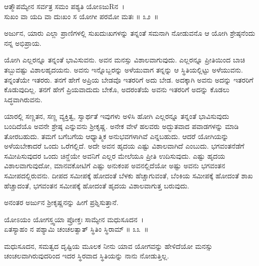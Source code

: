 \begin{shloka}
ಆತ್ಮೌಪಮ್ಯೇನ ಸರ್ವತ್ರ ಸಮಂ ಪಶ್ಯತಿ ಯೋಽಜುRನ~।\\ಸುಖಂ ವಾ ಯದಿ ವಾ ದುಃಖಂ ಸ ಯೋಗೀ ಪರಮೋ ಮತಃ \hfill॥ ೩೨~॥
\end{shloka}

\begin{artha}
ಅರ್ಜುನ, ಯಾರು ಎಲ್ಲಾ ಪ್ರಾಣಿಗಳಲ್ಲಿ ಸುಖದುಃಖಗಳನ್ನು ತನ್ನಂತೆ ಸಮನಾಗಿ ನೋಡುವನೊ ಆ ಯೋಗಿ ಶ್ರೇಷ್ಠನೆಂದು ನನ್ನ ಅಭಿಪ್ರಾಯ.
\end{artha}

ಯೋಗಿ ಎಲ್ಲರನ್ನೂ ತನ್ನಂತೆ ಭಾವಿಸುವನು. ಅವನ ಮನಸ್ಸು ವಿಶಾಲವಾಗುವುದು. ಎಲ್ಲರನ್ನೂ ಪ್ರೀತಿಯಿಂದ ಬಾಚಿ ತಬ್ಬುವಷ್ಟು ವಿಶಾಲಹೃದಯನು. ಅವನು ಇನ್ನೊಬ್ಬರನ್ನು ಅಳೆಯುವಾಗ ತನ್ನನ್ನು ಆ ಸ್ಥಿತಿಯಲ್ಲಿಟ್ಟು ಅಳೆಯುವನು. ತನ್ನಂತೆಯೇ ಇತರರು. ತನಗೆ ಹೇಗೆ ಅಪ್ರಿಯ ಬೇಡವೊ ಇತರರಿಗೆ ಅದು ಬೇಡ. ಅದಕ್ಕಾಗಿ ಅವನು ಅದನ್ನು ಇತರರಿಗೆ ಕೊಡುವುದಿಲ್ಲ. ತನಗೆ ಹೇಗೆ ಪ್ರಿಯವಾದುದು ಬೇಕೊ, ಅದರಂತೆಯೆ ಅವನು ಇತರರಿಗೆ ಅದನ್ನು ಕೊಡಲು ಸಿದ್ಧವಾಗಿರುವನು.

ಯಾರಲ್ಲಿ ಸಣ್ಣತನ, ಸಣ್ಣ ವ್ಯಕ್ತಿತ್ವ, ಸ್ವಾರ್ಥತೆ ಇವುಗಳು ಅಳಿಸಿ ಹೋಗಿ ಎಲ್ಲರನ್ನೂ ತನ್ನಂತೆ ಭಾವಿಸುವುದು ಬಂದಿದೆಯೊ ಅವನೇ ಶ್ರೇಷ್ಠ ಎನ್ನುವನು ಶ‍್ರೀಕೃಷ್ಣ. ಅನೇಕ ವೇಳೆ ಹಲವರು ಅದ್ಭುತವಾದ ಪವಾಡಗಳನ್ನು ಮಾಡಿ ತೋರಬಹುದು. ತಮಗೆ ಬಗೆಬಗೆಯ ಆಧ್ಯಾತ್ಮಿಕ ಅನುಭವಗಳಾಗಿವೆ ಎನ್ನಬಹುದು. ಆದರೆ ಯೋಗಿಯನ್ನು ಅಳೆಯಬೇಕಾದರೆ ಒಂದು ಒರೆಗಲ್ಲಿದೆ. ಅದೇ ಅವನ ಹೃದಯ ಎಷ್ಟು ವಿಶಾಲವಾಗಿದೆ ಎಂಬುದು. ಭಗವಂತನೆಡೆಗೆ ಸಮೀಪಿಸುವುದರ ಒಂದು ಚಿನ್ಹೆಯೇ ಅವನಿಗೆ ಎಲ್ಲರ ಮೇಲೆಯೂ ಪ್ರೀತಿ ಉದಿಸುವುದು. ಎಷ್ಟು ಹೃದಯ ವಿಶಾಲವಾಗುವುದೋ, ಮಾನವಕೋಟಿಗೆ ಎಷ್ಟು ಅನುಕಂಪ ಅವನಲ್ಲಿದೆಯೋ ಅಷ್ಟು ಅವನು ಭಗವಂತನ ಸಮೀಪದಲ್ಲಿರುವನು. ದೀಪದ ಸಮೀಪಕ್ಕೆ ಹೋದಂತೆ ಬೆಳಕು ಹೆಚ್ಚಾಗುವಂತೆ, ಬೆಂಕಿಯ ಸಮೀಪಕ್ಕೆ ಹೋದಂತೆ ಶಾಖ ಹೆಚ್ಚಾದಂತೆ, ಭಗವಂತನ ಸಮೀಪಕ್ಕೆ ಹೋದಂತೆ ಹೃದಯ ವಿಶಾಲವಾಗುತ್ತ ಬರುವುದು.

ಅನಂತರ ಅರ್ಜುನ ಶ‍್ರೀಕೃಷ್ಣನನ್ನು ಹೀಗೆ ಪ್ರಶ್ನಿಸುತ್ತಾನೆ.

\begin{shloka}
ಯೋಽಯಂ ಯೋಗಸ್ತ್ವಯಾ ಪ್ರೋಕ್ತಃ ಸಾಮ್ಯೇನ ಮಧುಸೂದನ~।\\ಏತಸ್ಯಾಹಂ ನ ಪಶ್ಯಾಮಿ ಚಂಚಲತ್ವಾತ್ ಸ್ಥಿತಿಂ ಸ್ಥಿರಾಮ್ \hfill॥ ೩೩~॥
\end{shloka}

\begin{artha}
ಮಧುಸೂದನ, ಸಮತ್ವದ ದೃಷ್ಟಿಯ ಮೂಲಕ ನೀನು ಯಾವ ಯೋಗವನ್ನು ಹೇಳಿದೆಯೋ ಮನಸ್ಸು ಚಂಚಲವಾಗಿರುವುದರಿಂದ ಇದರ ಸ್ಥಿರವಾದ ಸ್ಥಿತಿಯನ್ನು ನಾನು ನೋಡುತ್ತಿಲ್ಲ.
\end{artha}

